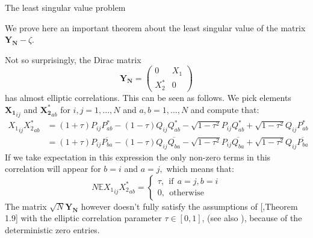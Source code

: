 \documentclass[11pt, a4paper, oneside]{book}
\numberwithin{equation}{chapter}
\newcommand{\E}{\mathbb E}
\newcommand{\beq}{\begin{equation}}
\newcommand{\eeq}{\end{equation}}
\begin{document}
\begin{section}{The least singular value problem} \label{lsv}

We prove here an important theorem about the least singular value of the matrix $\mathbf{Y_N} - \zeta.$

Not so surprisingly, the Dirac matrix
\[
\mathbf{Y_N} = \begin{pmatrix}
    0 & {X_1} \\ {X_2^*} & 0
\end{pmatrix}
\]
has almost elliptic correlations. This can be seen as follows. We pick elements $\mathbf{X_1}_{ij}$ and $\mathbf{X_2^*}_{ab}$ for $i,j=1,...,N$ and $a,b=1,...,N$ and compute that:
%
\begin{align*}
{X_1}_{ij} {X_2^*}_{ab} &= (1+\tau)P_{ij}P^*_{ab} - (1-\tau)Q_{ij}Q^*_{ab} - \sqrt{1-\tau^2}P_{ij}Q^*_{ab} + \sqrt{1-\tau^2}Q_{ij}P^*_{ab} \\
&= (1+\tau)P_{ij}\overline{P_{ba}} - (1-\tau)Q_{ij}\overline{Q_{ba}} - \sqrt{1-\tau^2}P_{ij}\overline{Q_{ba}} + \sqrt{1-\tau^2}Q_{ij}\overline{P_{ba}}
\end{align*}
%
If we take expectation in this expression the only non-zero terms in this correlation will appear for $b=i$ and $a=j,$ which means that:
\beq \label{corr}
N \E {X_1}_{ij} {X_2^*}_{ab} = \begin{cases} \tau , \ \ \text{if} \ \ a=j,b=i \\ 0,\ \ \text{otherwise}
\end{cases}
\eeq
%
The matrix $\sqrt{N}\mathbf{Y_N}$ however doesn't fully satisfy the assumptions of [\cite{nguyen2015elliptic},Theorem 1.9] with the elliptic correlation parameter $\tau \in [0,1]$, (see also \cite{gotze2015minimal}), because of the deterministic zero entries.


\end{section}
\end{document}
